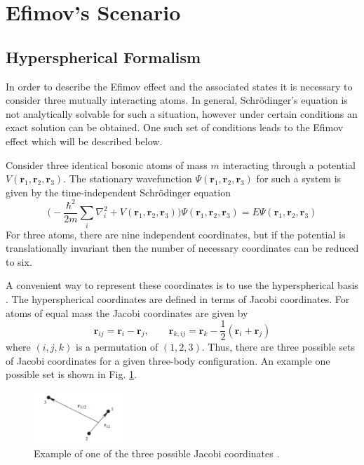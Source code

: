 \documentclass[prl,onecolumn,amsmath,amssymb,titlepage,nofootinbib,preprint]{revtex4-1}
\begin{document}

\section{Efimov's Scenario}

\subsection{Hyperspherical Formalism}
In order to describe the Efimov effect and the associated states it is necessary to consider three mutually interacting atoms.  In general, Schr\"{o}dinger's equation is not analytically solvable for such a situation, however under certain conditions an exact solution can be obtained.  One such set of conditions leads to the Efimov effect which will be described below.

Consider three identical bosonic atoms of mass $m$ interacting through a potential $V(\mathbf{r}_{1},\mathbf{r}_{2},\mathbf{r}_{3})$.  The stationary wavefunction $\Psi(\mathbf{r}_{1},\mathbf{r}_{2},\mathbf{r}_{3})$ for such a system is given by the time-independent Schr\"{o}dinger equation
	\begin{equation}\label{eq:TISE}
		\bigg(-\frac{\hbar^{2}}{2m}\sum_{i}\nabla^{2}_{i} + V(\mathbf{r}_{1},\mathbf{r}_{2},
		\mathbf{r}_{3})\bigg)\Psi(\mathbf{r}_{1},\mathbf{r}_{2},
		\mathbf{r}_{3})=E\Psi(\mathbf{r}_{1},
		\mathbf{r}_{2},\mathbf{r}_{3})
	\end{equation}
For three atoms, there are nine independent coordinates, but if the potential is translationally invariant then the number of necessary coordinates can be reduced to six.  

A convenient way to represent these coordinates is to use the hyperspherical basis \cite{Braaten_2006}.  The hyperspherical coordinates are defined in terms of Jacobi coordinates.  For atoms of equal mass the Jacobi coordinates are given by
	\begin{equation}
		\mathbf{r}_{ij}=\mathbf{r}_{i}-\mathbf{r}_{j}, \qquad \mathbf{r}_{k,ij}=\mathbf{r}_{k}-\frac{1}
		{2}(\mathbf{r}_{i}+\mathbf{r}_{j})
	\end{equation}
where $(i,j,k)$ is a permutation of $(1,2,3)$.  Thus, there are three possible sets of Jacobi coordinates for a given three-body configuration.  An example one possible set is shown in Fig. \ref{fig:jacobi_coord}. 
	\begin{figure}[h]
		\includegraphics[width=0.3\textwidth]{Figures/hyperradial_coord}
		\caption{Example of one of the three possible Jacobi coordinates \cite{Braaten_2006}.}
		\label{fig:jacobi_coord}
	\end{figure}
	
\end{document}
